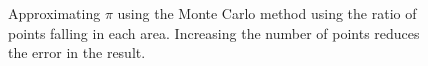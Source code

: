 \begin{figure}
    \centering
    \caption[Approximating $\pi$ using the monte carlo method]{Approximating $\pi$ using the Monte Carlo method using the ratio of points falling in each area. Increasing the number of points reduces the error in the result.}
    \label{fig:monte carlo pi}
\end{figure}


